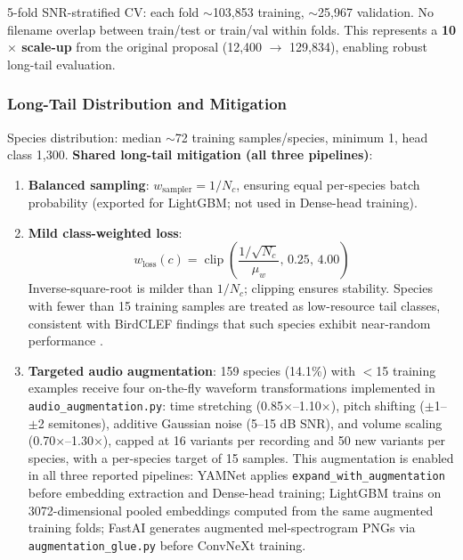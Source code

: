 \documentclass[conference]{IEEEtran}
\begin{document}
5-fold SNR-stratified CV: each fold $\sim$103,853 training, $\sim$25,967 validation. No filename overlap between train/test or train/val within folds. This represents a \textbf{10$\times$ scale-up} from the original proposal (12,400 $\rightarrow$ 129,834), enabling robust long-tail evaluation.

\subsubsection{Long-Tail Distribution and Mitigation}

Species distribution: median $\sim$72 training samples/species, minimum 1, head class 1,300. \textbf{Shared long-tail mitigation (all three pipelines)}:

\begin{enumerate}
    \item \textbf{Balanced sampling}: $w_{\text{sampler}} = 1 / N_c$, ensuring equal per-species batch probability (exported for LightGBM; not used in Dense-head training).
    
    \item \textbf{Mild class-weighted loss}:
    \begin{equation}
        w_{\text{loss}}(c) = \operatorname{clip}\left(\frac{1/\sqrt{N_c}}{\mu_w},\, 0.25,\, 4.00\right)
        \label{eq:loss_weight}
    \end{equation}
    Inverse-square-root is milder than $1/N_c$; clipping ensures stability. Species with fewer than 15 training samples are treated as low-resource tail classes, consistent with BirdCLEF findings that such species exhibit near-random performance \cite{witting2024addressing}.
    
    \item \textbf{Targeted audio augmentation}: 159 species (14.1\%) with $<$15 training examples receive four on-the-fly waveform transformations implemented in \texttt{audio\_augmentation.py}: time stretching (0.85$\times$--1.10$\times$), pitch shifting ($\pm$1--$\pm$2 semitones), additive Gaussian noise (5--15 dB SNR), and volume scaling (0.70$\times$--1.30$\times$), capped at 16 variants per recording and 50 new variants per species, with a per-species target of 15 samples. This augmentation is enabled in all three reported pipelines: YAMNet applies \texttt{expand\_with\_augmentation} before embedding extraction and Dense-head training; LightGBM trains on 3072-dimensional pooled embeddings computed from the same augmented training folds; FastAI generates augmented mel-spectrogram PNGs via \texttt{augmentation\_glue.py} before ConvNeXt training.
\end{enumerate}
\end{document}
